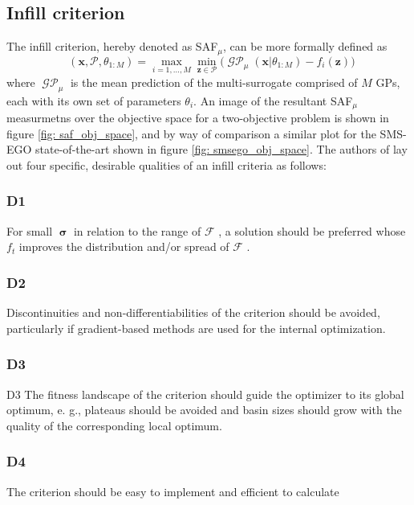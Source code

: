 \documentclass[conference]{IEEEtran}
\newcommand{\paretofront}{\mathcal{F}}
\newcommand{\nobj}{M}
\DeclareMathOperator*{\msafmu}{SAF_\mu}
\DeclareMathOperator*{\mgp}{\mathcal{GP}}
\DeclareMathOperator{\posterioruncertainty}{\bm{\sigma}}
\newcommand\safmu{SAF$_{\mu}$\xspace}
\newcommand\gps{GPs\xspace}
\newcommand\mP{\mathcal{P}}
\newcommand{\bx}{\mathbf{x}}
\newcommand{\bz}{\mathbf{z}}
\begin{document}
\subsection{Infill criterion}\label{section: infill_criterion}
The infill criterion, hereby denoted as \safmu, can be more formally defined as
\begin{equation}\label{eqn: SAF}
  \msafmu(\mathbf{x}, \mathcal{P}, \theta_{1:\nobj}) = %
  \max_{i=1,\ldots, \nobj} \min_{\bz \in \mP} \big(\mgp_{\mu}(\bx|\theta_{1:\nobj}) - f_i(\bz)\big)
\end{equation}
where $\mgp_{\mu}$ is the mean prediction of the multi-surrogate comprised of $\nobj$ \gps, each with its own set of parameters $\theta_i$. An image of the resultant \safmu measurmetns over the objective space for a two-objective problem is shown in figure \ref{fig: saf_obj_space}, and by way of comparison a similar plot for the SMS-EGO state-of-the-art shown in figure \ref{fig: smsego_obj_space}. The authors of \cite{wagner2010expected} lay out four specific, desirable qualities of an infill criteria as follows:

\subsubsection{D1}
For small $\posterioruncertainty$ in relation to the range of $\paretofront$ , a solution should be preferred whose $f_t$ improves the distribution and/or spread of $\paretofront$ .

\subsubsection{D2}
Discontinuities and non-differentiabilities of the criterion should be avoided, particularly if gradient-based methods are used for the internal optimization.

\subsubsection{D3}
D3 The fitness landscape of the criterion should guide the optimizer to its global optimum, e. g., plateaus should be avoided and basin sizes should grow with the quality of the corresponding local optimum.

\subsubsection{D4}
The criterion should be easy to implement and efficient to calculate
\end{document}
